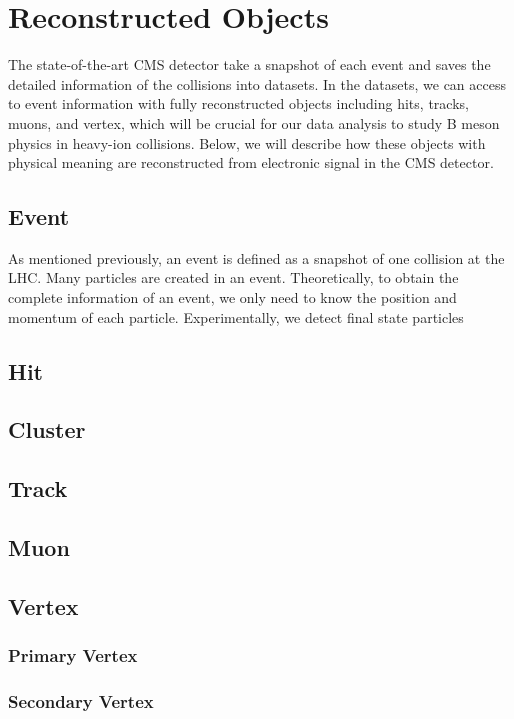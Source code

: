 \chapter{Reconstructed Objects}

The state-of-the-art CMS detector take a snapshot of each event and saves the detailed information of the collisions into datasets. In the datasets, we can access to event information with fully reconstructed objects including hits, tracks, muons, and vertex, which will be crucial for our data analysis to study B meson physics in heavy-ion collisions. Below, we will describe how these objects with physical meaning are reconstructed from electronic signal in the CMS detector.

\section{Event}

As mentioned previously, an event is defined as a snapshot of one collision at the LHC. Many particles are created in an event. Theoretically, to obtain the complete information of an event, we only need to know the position and momentum of each particle. Experimentally, we detect final state particles 

\section{Hit}

\section{Cluster}

\section{Track}

\section{Muon}

\section{Vertex}

\subsection{Primary Vertex}

\subsection{Secondary Vertex}

